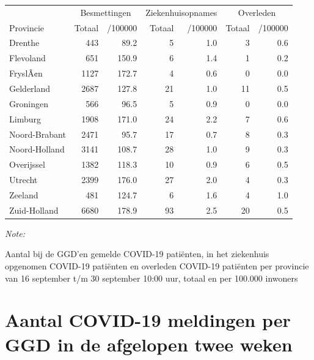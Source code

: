 \documentclass[
  english,
  man,floatsintext]{apa6}
\begin{document}
\begin{table}
\centering
\begin{threeparttable}
\begin{tabular}{lrrrrrr}
\toprule
\multicolumn{1}{c}{ } & \multicolumn{2}{c}{Besmettingen} & \multicolumn{2}{c}{Ziekenhuisopnames} & \multicolumn{2}{c}{Overleden} \\
\cmidrule(l{3pt}r{3pt}){2-3} \cmidrule(l{3pt}r{3pt}){4-5} \cmidrule(l{3pt}r{3pt}){6-7}
Provincie & Totaal & /100000 & Totaal & /100000 & Totaal & /100000\\
\midrule
Drenthe & 443 & 89.2 & 5 & 1.0 & 3 & 0.6\\
Flevoland & 651 & 150.9 & 6 & 1.4 & 1 & 0.2\\
FryslÃ¢n & 1127 & 172.7 & 4 & 0.6 & 0 & 0.0\\
Gelderland & 2687 & 127.8 & 21 & 1.0 & 11 & 0.5\\
Groningen & 566 & 96.5 & 5 & 0.9 & 0 & 0.0\\
Limburg & 1908 & 171.0 & 24 & 2.2 & 7 & 0.6\\
Noord-Brabant & 2471 & 95.7 & 17 & 0.7 & 8 & 0.3\\
Noord-Holland & 3141 & 108.7 & 28 & 1.0 & 9 & 0.3\\
Overijssel & 1382 & 118.3 & 10 & 0.9 & 6 & 0.5\\
Utrecht & 2399 & 176.0 & 27 & 2.0 & 4 & 0.3\\
Zeeland & 481 & 124.7 & 6 & 1.6 & 4 & 1.0\\
Zuid-Holland & 6680 & 178.9 & 93 & 2.5 & 20 & 0.5\\
\bottomrule
\end{tabular}
\begin{tablenotes}
\item \textit{Note: } 
\item Aantal bij de GGD’en gemelde COVID-19 patiënten, in het ziekenhuis opgenomen COVID-19 patiënten en overleden COVID-19 patiënten per provincie van 16 september t/m 30 september 10:00 uur, totaal en per 100.000 inwoners
\end{tablenotes}
\end{threeparttable}
\end{table}

\newpage

\hypertarget{aantal-covid-19-meldingen-per-ggd-in-de-afgelopen-twee-weken}{%
\section{Aantal COVID-19 meldingen per GGD in de afgelopen twee weken}\label{aantal-covid-19-meldingen-per-ggd-in-de-afgelopen-twee-weken}}
\end{document}
